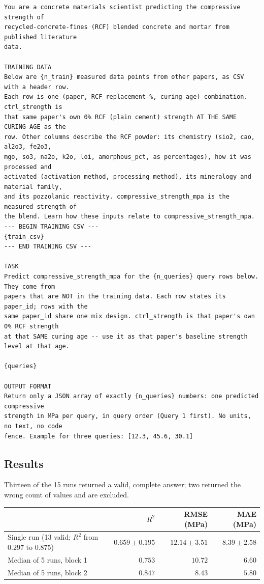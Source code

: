 \documentclass[11pt]{article}
\newcommand{\R}{$R^2$}
\begin{document}
\begin{center}
\begin{minipage}{0.92\linewidth}
\footnotesize
\begin{verbatim}
You are a concrete materials scientist predicting the compressive strength of
recycled-concrete-fines (RCF) blended concrete and mortar from published literature
data.

TRAINING DATA
Below are {n_train} measured data points from other papers, as CSV with a header row.
Each row is one (paper, RCF replacement %, curing age) combination. ctrl_strength is
that same paper's own 0% RCF (plain cement) strength AT THE SAME CURING AGE as the
row. Other columns describe the RCF powder: its chemistry (sio2, cao, al2o3, fe2o3,
mgo, so3, na2o, k2o, loi, amorphous_pct, as percentages), how it was processed and
activated (activation_method, processing_method), its mineralogy and material family,
and its pozzolanic reactivity. compressive_strength_mpa is the measured strength of
the blend. Learn how these inputs relate to compressive_strength_mpa.
--- BEGIN TRAINING CSV ---
{train_csv}
--- END TRAINING CSV ---

TASK
Predict compressive_strength_mpa for the {n_queries} query rows below. They come from
papers that are NOT in the training data. Each row states its paper_id; rows with the
same paper_id share one mix design. ctrl_strength is that paper's own 0% RCF strength
at that SAME curing age -- use it as that paper's baseline strength level at that age.

{queries}

OUTPUT FORMAT
Return only a JSON array of exactly {n_queries} numbers: one predicted compressive
strength in MPa per query, in query order (Query 1 first). No units, no text, no code
fence. Example for three queries: [12.3, 45.6, 30.1]
\end{verbatim}
\end{minipage}
\end{center}

\subsection{Results}
\label{sec:p2-llm-results}
Thirteen of the 15 runs returned a valid, complete answer; two returned the wrong
count of values and are excluded.

\begin{center}\small
\begin{tabular}{lrrr}
\toprule
& \R{} & RMSE (MPa) & MAE (MPa) \\
\midrule
Single run (13 valid; \R{} from $0.297$ to $0.875$) & $0.659\pm0.195$ & $12.14\pm3.51$ & $8.39\pm2.58$ \\
\rowcolor{green!12}Median of 5 runs, block 1 & $\mathbf{0.753}$ & $10.72$ & $6.60$ \\
\rowcolor{green!12}Median of 5 runs, block 2 & $\mathbf{0.847}$ & $8.43$ & $5.80$ \\
\bottomrule
\end{tabular}
\end{center}
\end{document}
